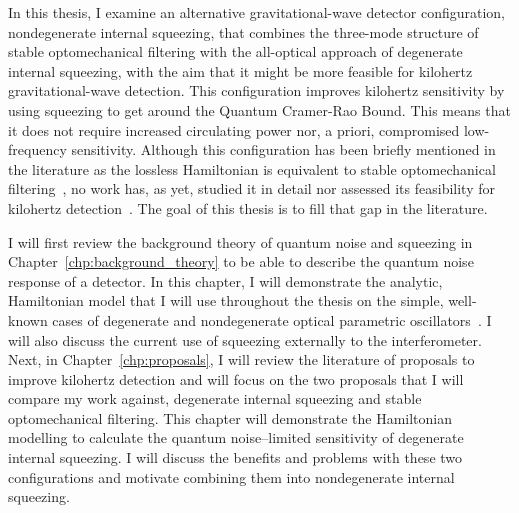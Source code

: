 In this thesis, I examine an alternative gravitational-wave detector configuration, nondegenerate internal squeezing, that combines the three-mode structure of stable optomechanical filtering with the all-optical approach of degenerate internal squeezing, with the aim that it might be more feasible for kilohertz gravitational-wave detection. This configuration improves kilohertz sensitivity by using squeezing to get around the Quantum Cramer-Rao Bound. This means that it does not require increased circulating power nor, a priori, compromised low-frequency sensitivity. Although this configuration has been briefly mentioned in the literature as the lossless Hamiltonian is equivalent to stable optomechanical filtering~\cite{liBroadbandSensitivityImprovement2020}, no work has, as yet, studied it in detail nor assessed its feasibility for kilohertz detection~\cite{}. The goal of this thesis is to fill that gap in the literature.

I will first review the background theory of quantum noise and squeezing in Chapter~\ref{chp:background_theory} to be able to describe the quantum noise response of a detector. In this chapter, I will demonstrate the analytic, Hamiltonian model that I will use throughout the thesis on the simple, well-known cases of degenerate and nondegenerate optical parametric oscillators~\cite{}. I will also discuss the current use of squeezing externally to the interferometer. Next, in Chapter~\ref{chp:proposals}, I will review the literature of proposals to improve kilohertz detection and will focus on the two proposals that I will compare my work against, degenerate internal squeezing and stable optomechanical filtering. This chapter will demonstrate the Hamiltonian modelling to calculate the quantum noise--limited sensitivity of degenerate internal squeezing. I will discuss the benefits and problems with these two configurations and motivate combining them into nondegenerate internal squeezing.

